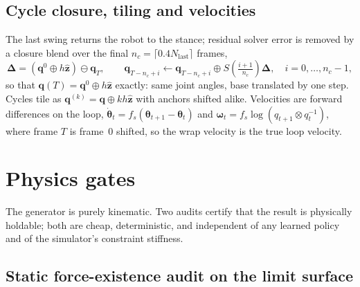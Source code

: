 \documentclass[11pt]{article}
\newcommand{\zhat}{\hat{\bm z}}
\begin{document}
\subsection{Cycle closure, tiling and velocities}

The last swing returns the robot to the stance; residual solver error is
removed by a closure blend over the final $n_c=\lceil0.4N_{\mathrm{last}}\rceil$
frames,
\begin{equation}
  \bm\Delta=(\bm q^0\oplus h\zhat)\ominus\bm q_{T},\qquad
  \bm q_{T-n_c+i}\leftarrow\bm q_{T-n_c+i}\oplus S\!\left(\tfrac{i+1}{n_c}\right)\bm\Delta,
  \quad i=0,\dots,n_c-1,
\end{equation}
so that $\bm q(T)=\bm q^0\oplus h\zhat$ exactly: same joint angles, base
translated by one step. Cycles tile as $\bm q^{(k)}=\bm q\oplus kh\zhat$ with
anchors shifted alike. Velocities are forward differences on the loop,
$\dot{\bm\theta}_t=f_s(\bm\theta_{t+1}-\bm\theta_t)$ and
$\bm\omega_t=f_s\log(q_{t+1}\otimes q_t^{-1})$, where frame $T$ is frame~0
shifted, so the wrap velocity is the true loop velocity.

\section{Physics gates}
\label{sec:gates}

The generator is purely kinematic. Two audits certify that the result is
physically holdable; both are cheap, deterministic, and independent of any
learned policy and of the simulator's constraint stiffness.

\subsection{Static force-existence audit on the limit surface}
\end{document}

